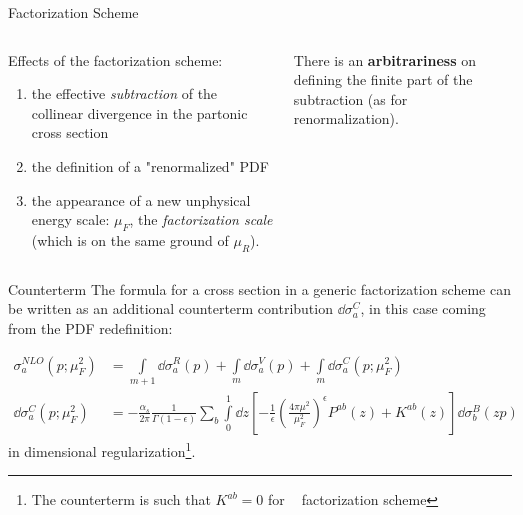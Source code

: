 \documentclass[8pt]{beamer}
\DeclareMathOperator{\msbar}{\overline{MS}}
\begin{document}
\begin{frame}{Factorization Scheme}
    \begin{columns}
        \begin{column}{0.6\textwidth}
            Effects of the factorization scheme:
            \begin{enumerate}
                \item the effective \textit{subtraction} of the collinear divergence
                    in the partonic cross section
                \item the definition of a "renormalized" PDF
                \item the appearance of a new unphysical energy scale: $\mu_F$, the
                    \textit{factorization scale} (which is on the same ground of $\mu_R$).
            \end{enumerate}
        \end{column}

        \begin{column}{0.4\textwidth}
            There is an \textbf{arbitrariness} on defining the finite part of
            the subtraction (as for renormalization).
        \end{column}
    \end{columns}

    \vspace*{15pt}

    \begin{block}{Counterterm}
    \vspace*{1pt}
    The formula for a cross section in a generic factorization scheme can be
    written as an additional counterterm contribution $\dd\sigma^C_a$, in this
    case coming from the PDF redefinition:
    \end{block}
    \begin{align*}
        \sigma_a^{NLO}(p; \mu_F^2) &= \int\limits_{m+1} \dd\sigma^R_a(p) +
        \int\limits_{m} \dd\sigma^V_a(p) + \int\limits_{m} \dd\sigma^C_a(p;
        \mu_F^2)\\
        \dd\sigma^C_a(p;\mu_F^2) &= - \frac{\alpha_s}{2\pi}
        \frac{1}{\Gamma(1-\epsilon)} \sum_b \int\limits_0^1 \dd z \left[ -
        \frac{1}{\epsilon} \left(\frac{4\pi\mu^2}{\mu_F^2}\right)^\epsilon
        P^{ab}(z) + K^{ab}(z) \right] \dd \sigma_b^B(zp)
    \end{align*}
    in dimensional regularization\footnote{The counterterm is such that
    $K^{ab}=0$ for $\msbar$ factorization scheme}.
\end{frame}
\end{document}
